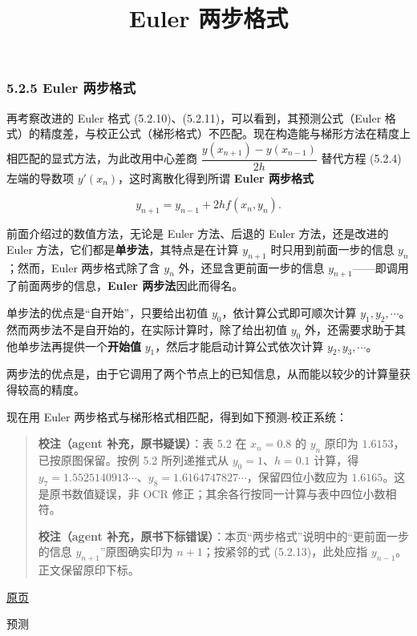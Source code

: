 \documentclass[
  10pt,
  fontset=fandol]{ctexart}
\title{Euler 两步格式}
\author{}
\date{}
\begin{document}
\maketitle

\subsubsection{5.2.5 Euler 两步格式}\label{euler-ux4e24ux6b65ux683cux5f0f}

再考察改进的 Euler 格式 (5.2.10)、(5.2.11)，可以看到，其预测公式（Euler 格式）的精度差，与校正公式（梯形格式）不匹配。现在构造能与梯形方法在精度上相匹配的显式方法，为此改用中心差商 \(\dfrac{y(x_{n+1})-y(x_{n-1})}{2h}\) 替代方程 (5.2.4) 左端的导数项 \(y'(x_n)\)，这时离散化得到所谓 \textbf{Euler 两步格式}

\[
y_{n+1}=y_{n-1}+2hf(x_n,y_n).\tag{5.2.13}
\]

前面介绍过的数值方法，无论是 Euler 方法、后退的 Euler 方法，还是改进的 Euler 方法，它们都是\textbf{单步法}，其特点是在计算 \(y_{n+1}\) 时只用到前面一步的信息 \(y_n\)；然而，Euler 两步格式除了含 \(y_n\) 外，还显含更前面一步的信息 \(y_{n+1}\)------即调用了前面两步的信息，\textbf{Euler 两步法}因此而得名。

单步法的优点是``自开始''，只要给出初值 \(y_0\)，依计算公式即可顺次计算 \(y_1,y_2,\cdots\)。然而两步法不是自开始的，在实际计算时，除了给出初值 \(y_0\) 外，还需要求助于其他单步法再提供一个\textbf{开始值} \(y_1\)，然后才能启动计算公式依次计算 \(y_2,y_3,\cdots\)。

两步法的优点是，由于它调用了两个节点上的已知信息，从而能以较少的计算量获得较高的精度。

现在用 Euler 两步格式与梯形格式相匹配，得到如下预测-校正系统：

\begin{quote}
\textbf{校注（agent 补充，原书疑误）}：表 5.2 在 \(x_n=0.8\) 的 \(y_n\) 原印为 \(1.6153\)，已按原图保留。按例 5.2 所列递推式从 \(y_0=1\)、\(h=0.1\) 计算，得 \(y_7=1.5525140913\cdots\)、\(y_8=1.6164747827\cdots\)，保留四位小数应为 \(1.6165\)。这是原书数值疑误，非 OCR 修正；其余各行按同一计算与表中四位小数相符。

\textbf{校注（agent 补充，原书下标错误）}：本页``两步格式''说明中的``更前面一步的信息 \(y_{n+1}\)''原图确实印为 \(n+1\)；按紧邻的式 (5.2.13)，此处应指 \(y_{n-1}\)。正文保留原印下标。
\end{quote}

\href{../../source-images/pdf-125.jpeg}{原页}

预测
\end{document}
